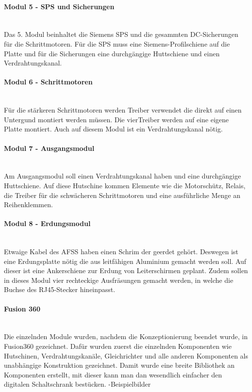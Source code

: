     \paragraph{Modul 5 - SPS und Sicherungen}\mbox{}\\
    Das 5. Modul beinhaltet die Siemens SPS und die gesammten DC-Sicherungen für die Schrittmotoren. Für die SPS muss eine Siemens-Profilschiene auf die Platte und für die Sicherungen eine durchgängige Huttschiene und einen Verdrahtungskanal.
    \paragraph{Modul 6 - Schrittmotoren}\mbox{}\\
    Für die stärkeren Schrittmotoren werden Treiber verwendet die direkt auf einen Untergund montiert werden müssen. Die vierTreiber werden auf eine eigene Platte montiert. Auch auf diesem Modul ist ein Verdrahtungskanal nötig.
    \paragraph{Modul 7 - Ausgangsmodul}\mbox{}\\
    Am Ausgangsmodul soll einen Verdrahtungskanal haben und eine durchgängige Huttschiene. Auf diese Hutschine kommen Elemente wie die Motorschütz, Relais, die Treiber für die schwächeren Schrittmotoren und eine ausführliche Menge an Reihenklemmen.
    \paragraph{Modul 8 - Erdungsmodul}\mbox{}\\
    Etwaige Kabel des AFSS haben einen Schrim der geerdet gehört. Deswegen ist eine Erdungsplatte nötig die aus leitfähigen Aluminium gemacht werden soll. Auf dieser ist eine Ankerschiene zur Erdung von Leiterschirmen geplant. Zudem sollen in dieses Modul vier rechteckige Ausfräsungen gemacht werden, in welche die Buchse des RJ45-Stecker hineinpasst.

    \paragraph{Fusion 360}\mbox{}\\
    Die einzelnden Module wurden, nachdem die Konzeptionierung beendet wurde, in Fusion360 gezeichnet. Dafür wurden zuerst die einzelnden Komponenten wie Hutschinen, Verdrahtungskanäle, Gleichrichter und alle anderen Komponenten als unabhängige Konstruktion gezeichnet. Damit wurde eine breite Bibliothek an Komponenten erstellt, mit dieser kann man dan wesendlich einfacher den digitalen Schaltschrank bestücken. 
    -Beispielbilder


